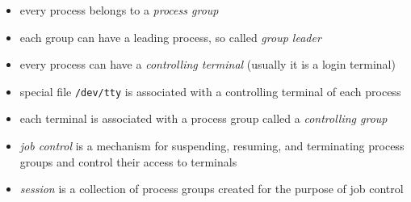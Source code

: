 

\begin{slide}
\begin{itemize}
\item every process belongs to a \emph{process group}
\item each group can have a leading process, so called \emph{group leader}
\item every process can have a \emph{controlling terminal} (usually it is a
login terminal)
\item special file \texttt{/dev/tty} is associated with a controlling terminal
of each process
\item each terminal is associated with a process group called a
\emph{controlling group}
\item \emph{job control} is a mechanism for suspending, resuming, and
terminating process groups and control their access to terminals
\item \emph{session} is a collection of process groups created for the purpose
of job control
\end{itemize}
\end{slide}

